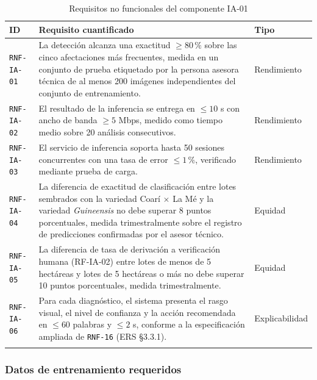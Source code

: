 \documentclass[11pt,a4paper]{article}
\newcommand{\id}[1]{\texttt{#1}}
\begin{document}
\begin{longtable}{|L{1.9cm}|L{10.6cm}|L{2.0cm}|}
\hline
{}\textbf{ID} & \textbf{Requisito cuantificado} & \textbf{Tipo} \\ \hline
\endhead
\id{RNF-IA-01} & La detección alcanza una exactitud $\geq 80\,\%$ sobre las cinco afectaciones más
frecuentes, medida en un conjunto de prueba etiquetado por la persona asesora técnica de al menos
200 imágenes independientes del conjunto de entrenamiento. & Rendimiento \\ \hline
\id{RNF-IA-02} & El resultado de la inferencia se entrega en $\leq 10$ s con ancho de banda
$\geq 5$ Mbps, medido como tiempo medio sobre 20 análisis consecutivos. & Rendimiento \\ \hline
\id{RNF-IA-03} & El servicio de inferencia soporta hasta 50 sesiones concurrentes con una tasa de
error $\leq 1\,\%$, verificado mediante prueba de carga. & Rendimiento \\ \hline
{}
\id{RNF-IA-04} & La diferencia de exactitud de clasificación entre lotes sembrados con la variedad
Coarí $\times$ La Mé y la variedad \emph{Guineensis} no debe superar 8 puntos porcentuales, medida
trimestralmente sobre el registro de predicciones confirmadas por el asesor técnico. & Equidad \\
\hline
{}
\id{RNF-IA-05} & La diferencia de tasa de derivación a verificación humana (RF-IA-02) entre lotes de
menos de 5 hectáreas y lotes de 5 hectáreas o más no debe superar 10 puntos porcentuales, medida
trimestralmente. & Equidad \\ \hline
\id{RNF-IA-06} & Para cada diagnóstico, el sistema presenta el rasgo visual, el nivel de confianza y
la acción recomendada en $\leq 60$ palabras y $\leq 2$ s, conforme a la especificación ampliada de
\id{RNF-16} (ERS §3.3.1). & Explicabilidad \\ \hline
\caption{Requisitos no funcionales del componente IA-01}
\end{longtable}

\subsubsection{Datos de entrenamiento requeridos}
\end{document}
